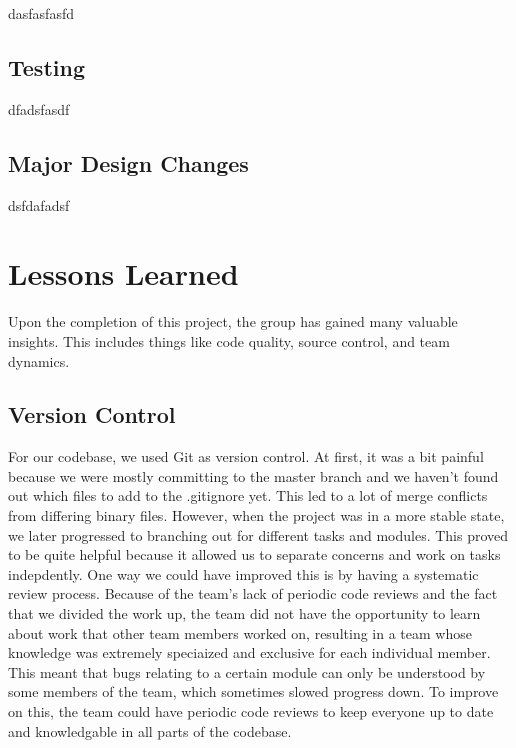 \documentclass[12pt]{report}
\begin{document}
dasfasfasfd

\section{Testing}

dfadsfasdf

\section{Major Design Changes}

dsfdafadsf

\chapter{Lessons Learned}

Upon the completion of this project, the group has gained many valuable insights. This includes things like code quality, source control, and team dynamics.

\section{Version Control}
For our codebase, we used Git as version control. At first, it was a bit painful because we were mostly committing to the master branch and we haven't found out which files to add to the .gitignore yet. This led to a lot of merge conflicts from differing binary files.
However, when the project was in a more stable state, we later progressed to branching out for different tasks and modules. This proved to be quite helpful because it allowed us to separate concerns and work on tasks indepdently.
One way we could have improved this is by having a systematic review process. Because of the team's lack of periodic code reviews and the fact that we divided the work up, the team did not have the opportunity to learn about work that other team members worked on, resulting in a team whose knowledge was extremely speciaized and exclusive for each individual member. This meant that bugs relating to a certain module can only be understood by some members of the team, which sometimes slowed progress down. To improve on this, the team could have periodic code reviews to keep everyone up to date and knowledgable in all parts of the codebase.
\end{document}
